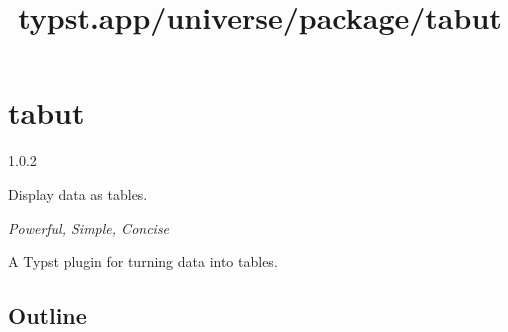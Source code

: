 \title{typst.app/universe/package/tabut}

\label{banner}
\section{tabut}\label{tabut}

{ 1.0.2 }

Display data as tables.

\label{readme}
\emph{Powerful, Simple, Concise}

A Typst plugin for turning data into tables.

\subsection{Outline}\label{outline}

